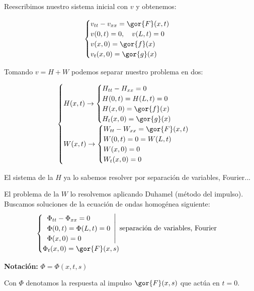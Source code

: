 			Reescribimos nuestro sistema inicial con $v$ y obtenemos:

			\[ \begin{cases}
				v_{tt} - v_{xx} = \gor{F}(x,t)\\
				v(0,t) = 0, \quad v(L,t) = 0 \\
				v(x,0) = \gor{f}(x) \\
				v_t(x,0) = \gor{g}(x)
			\end{cases}\]

			Tomando $v = H + W$ podemos separar nuestro problema en dos:

			\[ \begin{cases}
					H(x,t) \rightarrow
					\begin{cases}
						H_{tt} - H_{xx} = 0\\
						H(0,t) = H(L,t) = 0 \\
						H(x,0) = \gor{f}(x) \\
						H_t(x,0) = \gor{g}(x)
					\end{cases}\\
					W(x,t) \rightarrow
					\begin{cases}
						W_{tt} - W_{xx} = \gor{F}(x,t)\\
						W(0,t) = 0 = W(L,t) \\
						W(x,0) = 0 \\
						W_t(x,0) = 0
					\end{cases}
				 \end{cases}
			\]

			El sistema de la $H$ ya lo sabemos resolver por separación de variables, Fourier...

			El problema de la $W$ lo resolvemos aplicando Duhamel (método del impulso).
			Buscamos soluciones de la ecuación de ondas homogénea siguiente: 
			\[\begin{cases}
				\left.
				\begin{array}{l}
					\Phi_{tt} - \Phi_{xx} = 0 \\
					\Phi(0,t) = \Phi(L,t) = 0 \\
					\Phi(x,0) = 0 \\
				\end{array}
				\right| \text{ separación de variables, Fourier} \\
				\Phi_t(x,0) = \gor{F}(x,s)
			\end{cases}\]

			\textbf{Notación:} $ \Phi = \Phi(x,t,s)$

			Con $\Phi$ denotamos la respuesta al impulso $\gor{F}(x,s)$ que actúa en $t=0$.

